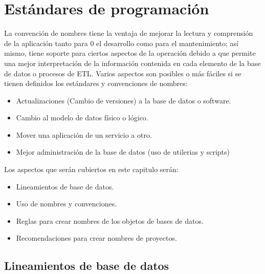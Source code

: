 \chapter{Estándares de programación}
\label{cap:estandares}

La convención de nombres tiene la ventaja de mejorar la lectura y comprensión de la aplicación tanto para 0
el desarrollo como para el mantenimiento; así mismo, tiene soporte para ciertos aspectos de la operación 
debido a que permite una mejor interpretación de la información contenida en cada elemento de la base de datos 
o procesos de ETL. Varios aspectos son posibles o más fáciles si se tienen definidos los estándares y convenciones 
de nombres:

\begin{itemize}
\item Actualizaciones (Cambio de versiones) a la base de datos o software.
\item Cambio al modelo de datos físico o lógico.
\item Mover una aplicación de un servicio a otro.
\item Mejor administración de la base de datos (uso de utilerias y scripts)
\end{itemize}

Los aspectos que serán cubiertos en este capitulo serán:

\begin{itemize}
    \item Lineamientos de base de datos.
    \item Uso de nombres y convenciones.
    \item Reglas para crear nombres de los objetos de bases de datos.
    \item Recomendaciones para crear nombres de proyectos.
\end{itemize}

\section{Lineamientos de base de datos}

